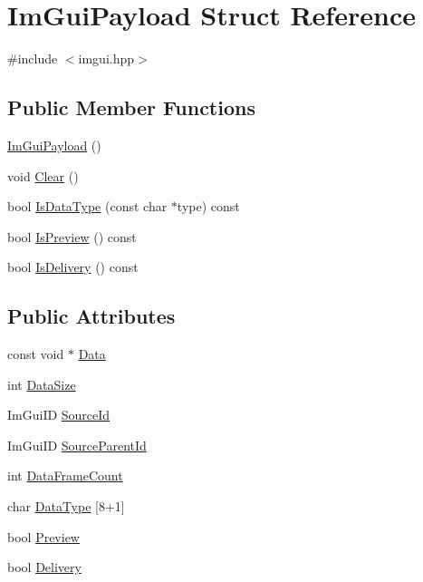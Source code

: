 \hypertarget{struct_im_gui_payload}{}\section{Im\+Gui\+Payload Struct Reference}
\label{struct_im_gui_payload}


{\ttfamily \#include $<$imgui.\+hpp$>$}

\subsection*{Public Member Functions}
\begin{DoxyCompactItemize}
\item 
\hyperlink{struct_im_gui_payload_a341c0039af838af0308a7449f8c1308b}{Im\+Gui\+Payload} ()
\item 
void \hyperlink{struct_im_gui_payload_a88c2293d356eb05e7a30d7693de186f2}{Clear} ()
\item 
bool \hyperlink{struct_im_gui_payload_a7864aeb80bc28683748d015562eead4d}{Is\+Data\+Type} (const char $\ast$type) const
\item 
bool \hyperlink{struct_im_gui_payload_a4a7e17de25fd86c5ada447aaec412070}{Is\+Preview} () const
\item 
bool \hyperlink{struct_im_gui_payload_adcc193e0d454bf394e76e5498eea808d}{Is\+Delivery} () const
\end{DoxyCompactItemize}
\subsection*{Public Attributes}
\begin{DoxyCompactItemize}
\item 
const void $\ast$ \hyperlink{struct_im_gui_payload_a4a61d87ab86d89dddc4fd886f5446d21}{Data}
\item 
int \hyperlink{struct_im_gui_payload_a6730d3ace5353afe204273995994cd92}{Data\+Size}
\item 
Im\+Gui\+ID \hyperlink{struct_im_gui_payload_aa574f7e237c6d2172977d142b25c0111}{Source\+Id}
\item 
Im\+Gui\+ID \hyperlink{struct_im_gui_payload_a1757c714dd47f09b645a8eba2912849d}{Source\+Parent\+Id}
\item 
int \hyperlink{struct_im_gui_payload_ab9f21d2454197d14896d5812ba70fa33}{Data\+Frame\+Count}
\item 
char \hyperlink{struct_im_gui_payload_afd363887df974507422cd09f2ebb3d73}{Data\+Type} \mbox{[}8+1\mbox{]}
\item 
bool \hyperlink{struct_im_gui_payload_a1a5b6456247ef3c213f0706cc9da16e6}{Preview}
\item 
bool \hyperlink{struct_im_gui_payload_a4c0900e12c8d0bf6869c0ac6f8a66e31}{Delivery}
\end{DoxyCompactItemize}


